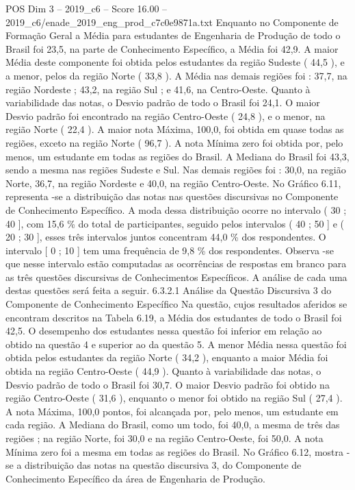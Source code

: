 \begin{textsample}{POS Dim 3 – 2019\_c6 – Score 16.00 – 2019\_c6/enade\_2019\_eng\_prod\_c7c0e9871a.txt}
Enquanto no Componente de Formação Geral a Média para estudantes de Engenharia de Produção de todo o Brasil foi 23,5, na parte de Conhecimento Específico, a Média foi 42,9.
A maior Média deste componente foi obtida pelos estudantes da região Sudeste ( 44,5 ), e a menor, pelos da região Norte ( 33,8 ).
A Média nas demais regiões foi : 37,7, na região Nordeste ; 43,2, na região Sul ; e 41,6, na Centro-Oeste.
Quanto à variabilidade das notas, o Desvio padrão de todo o Brasil foi 24,1.
O maior Desvio padrão foi encontrado na região Centro-Oeste ( 24,8 ), e o menor, na região Norte ( 22,4 ).
A maior nota Máxima, 100,0, foi obtida em quase todas as regiões, exceto na região Norte ( 96,7 ).
A nota Mínima zero foi obtida por, pelo menos, um estudante em todas as regiões do Brasil.
A Mediana do Brasil foi 43,3, sendo a mesma nas regiões Sudeste e Sul.
Nas demais regiões foi : 30,0, na região Norte, 36,7, na região Nordeste e 40,0, na região Centro-Oeste.
No Gráfico 6.11, representa -se a distribuição das notas nas questões discursivas no Componente de Conhecimento Específico.
A moda dessa distribuição ocorre no intervalo ( 30 ; 40 ], com 15,6 \% do total de participantes, seguido pelos intervalos ( 40 ; 50 ] e ( 20 ; 30 ], esses três intervalos juntos concentram 44,0 \% dos respondentes.
O intervalo [ 0 ; 10 ] tem uma frequência de 9,8 \% dos respondentes.
Observa -se que nesse intervalo estão computadas as ocorrências de respostas em branco para as três questões discursivas de Conhecimentos Específicos.
A análise de cada uma destas questões será feita a seguir. 6.3.2.1 Análise da Questão Discursiva 3 do Componente de Conhecimento Específico Na questão, cujos resultados aferidos se encontram descritos na Tabela 6.19, a Média dos estudantes de todo o Brasil foi 42,5.
O desempenho dos estudantes nessa questão foi inferior em relação ao obtido na questão 4 e superior ao da questão 5.
A menor Média nessa questão foi obtida pelos estudantes da região Norte ( 34,2 ), enquanto a maior Média foi obtida na região Centro-Oeste ( 44,9 ).
Quanto à variabilidade das notas, o Desvio padrão de todo o Brasil foi 30,7.
O maior Desvio padrão foi obtido na região Centro-Oeste ( 31,6 ), enquanto o menor foi obtido na região Sul ( 27,4 ).
A nota Máxima, 100,0 pontos, foi alcançada por, pelo menos, um estudante em cada região.
A Mediana do Brasil, como um todo, foi 40,0, a mesma de três das regiões ; na região Norte, foi 30,0 e na região Centro-Oeste, foi 50,0.
A nota Mínima zero foi a mesma em todas as regiões do Brasil.
No Gráfico 6.12, mostra -se a distribuição das notas na questão discursiva 3, do Componente de Conhecimento Específico da área de Engenharia de Produção.

\end{textsample}
